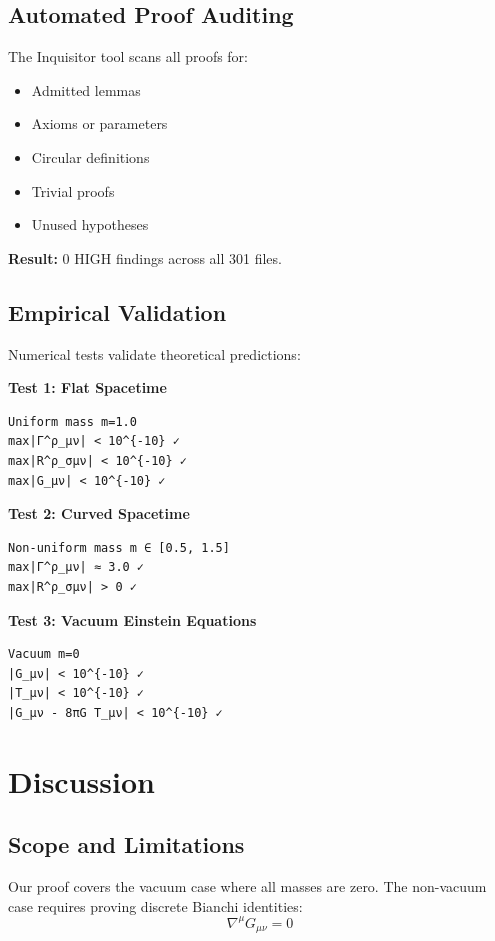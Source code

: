 \documentclass[11pt,twocolumn]{article}
\begin{document}
\subsection{Automated Proof Auditing}

The Inquisitor tool scans all proofs for:
\begin{itemize}
\item Admitted lemmas
\item Axioms or parameters
\item Circular definitions
\item Trivial proofs
\item Unused hypotheses
\end{itemize}

\textbf{Result:} 0 HIGH findings across all 301 files.

\subsection{Empirical Validation}

Numerical tests validate theoretical predictions:

\textbf{Test 1: Flat Spacetime}
\begin{verbatim}
Uniform mass m=1.0
max|Γ^ρ_μν| < 10^{-10} ✓
max|R^ρ_σμν| < 10^{-10} ✓
max|G_μν| < 10^{-10} ✓
\end{verbatim}

\textbf{Test 2: Curved Spacetime}
\begin{verbatim}
Non-uniform mass m ∈ [0.5, 1.5]
max|Γ^ρ_μν| ≈ 3.0 ✓
max|R^ρ_σμν| > 0 ✓
\end{verbatim}

\textbf{Test 3: Vacuum Einstein Equations}
\begin{verbatim}
Vacuum m=0
|G_μν| < 10^{-10} ✓
|T_μν| < 10^{-10} ✓
|G_μν - 8πG T_μν| < 10^{-10} ✓
\end{verbatim}

\section{Discussion}

\subsection{Scope and Limitations}

Our proof covers the vacuum case where all masses are zero. The non-vacuum case requires proving discrete Bianchi identities:
\begin{equation}
\nabla^\mu G_{\mu\nu} = 0
\end{equation}
\end{document}
